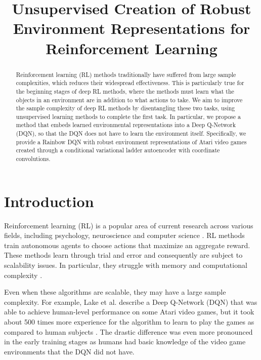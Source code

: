 \documentclass{article}
\title{Unsupervised Creation of Robust Environment Representations for Reinforcement Learning}
\author{}
\begin{document}
\maketitle

\begin{abstract}
Reinforcement learning (RL) methods traditionally have suffered from large sample complexities, which reduces their widespread effectiveness.
This is particularly true for the beginning stages of deep RL methods, where the methods must learn what the objects in an environment are in addition to what actions to take.
We aim to improve the sample complexity of deep RL methods by disentangling these two tasks, using unsupervised learning methods to complete the first task.
In particular, we propose a method that embeds learned environmental representations into a Deep Q-Network (DQN), so that the DQN does not have to learn the environment itself.
Specifically, we provide a Rainbow DQN with robust environment representations of Atari video games created through a conditional variational ladder autoencoder with coordinate convolutions.
\end{abstract}

\section{Introduction}

Reinforcement learning (RL) is a popular area of current research across various fields, including psychology, neuroscience and computer science \cite{kaelbling:reinforcement}.
RL methods train autonomous agents to choose actions that maximize an aggregate reward.
These methods learn through trial and error and consequently are subject to scalability issues.
In particular, they struggle with memory and computational complexity  \cite{arulkumaran:survey}.

Even when these algorithms are scalable, they may have a large sample complexity.
For example, Lake et al. describe a Deep Q-Network (DQN) that was able to achieve human-level performance on some Atari video games, but it took about 500 times more experience for the algorithm to learn to play the games as compared to human subjects \cite{lake:building}.
The drastic difference was even more pronounced in the early training stages as humans had basic knowledge of the video game environments that the DQN did not have.
\end{document}
